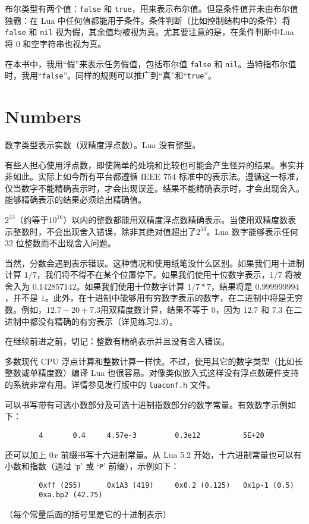 布尔类型有两个值：\verb|false| 和 \verb|true|，用来表示布尔值。但是条件值并未由布尔值独霸：在 Lua 中任何值都能用于条件。条件判断（比如控制结构中的条件）将 \verb|false| 和 \verb|nil| 视为假，其余值均被视为真。尤其要注意的是，在条件判断中Lua 将 0 和空字符串也视为真。

在本书中，我用“假”来表示任务假值，包括布尔值 \verb|false| 和 \verb|nil|。当特指布尔值时，我用“\verb|false|”。同样的规则可以推广到“真”和“\verb|true|”。

\section{Numbers}

数字类型表示实数（双精度浮点数）。Lua 没有整型。

有些人担心使用浮点数，即使简单的处境和比较也可能会产生怪异的结果。事实并非如此。实际上如今所有平台都遵循 IEEE 754 标准中的表示法。遵循这一标准，仅当数字不能精确表示时，才会出现误差。结果不能精确表示时，才会出现舍入。能够精确表示的结果必须给出精确值。

$2^{53}$（约等于$10^{16}$）以内的整数都能用双精度浮点数精确表示。当使用双精度数表示整数时，不会出现舍入错误，除非其绝对值超出了$2^{53}$。Lua 数字能够表示任何 32 位整数而不出现舍入问题。

当然，分数会遇到表示错误。这种情况和使用纸笔没什么区别。如果我们用十进制计算 $1/7$，我们将不得不在某个位置停下。如果我们使用十位数字表示，$1/7$ 将被舍入为 $0.142857142$。如果我们使用十位数字计算 $1/7*7$，结果将是 $0.999999994$，并不是 $1$。此外，在十进制中能够用有穷数字表示的数字，在二进制中将是无穷数。例如，$12.7-20+7.3$用双精度数计算，结果不等于 $0$，因为 $12.7$ 和 $7.3$ 在二进制中都没有精确的有穷表示（详见练习2.3）。

在继续前进之前，切记：整数有精确表示并且没有舍入错误。

多数现代 CPU 浮点计算和整数计算一样快。不过，使用其它的数字类型（比如长整数或单精度数）编译 Lua 也很容易。对像类似嵌入式这样没有浮点数硬件支持的系统非常有用。详情参见发行版中的 \verb|luaconf.h| 文件。

可以书写带有可选小数部分及可选十进制指数部分的数字常量。有效数字示例如下：
\begin{verbatim}
        4       0.4     4.57e-3         0.3e12          5E+20
\end{verbatim}
还可以加上 $0x$ 前缀书写十六进制常量。从 Lua 5.2 开始，十六进制常量也可以有小数和指数（通过 `\verb|p|' 或 `\verb|P|' 前缀），示例如下：
\begin{verbatim}
        0xff (255)      0x1A3 (419)     0x0.2 (0.125)   0x1p-1 (0.5)
        0xa.bp2 (42.75)
\end{verbatim}
（每个常量后面的括号里是它的十进制表示）
